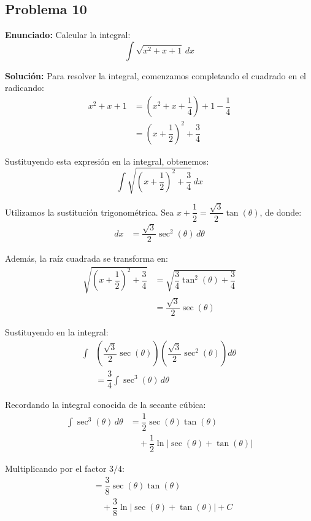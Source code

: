 \subsection*{Problema 10}
\textbf{Enunciado:} Calcular la integral:
\begin{equation*}
\int \sqrt{x^2 + x + 1} \, dx
\end{equation*}

\textbf{Solución:} Para resolver la integral, comenzamos completando el cuadrado en el radicando:
\begin{align*}
x^2 + x + 1 &= \left(x^2 + x + \dfrac{1}{4}\right) + 1 - \dfrac{1}{4} \\
&= \left(x + \dfrac{1}{2}\right)^2 + \dfrac{3}{4}
\end{align*}

Sustituyendo esta expresión en la integral, obtenemos:
\begin{equation*}
\int \sqrt{\left(x + \dfrac{1}{2}\right)^2 + \dfrac{3}{4}} \, dx
\end{equation*}

Utilizamos la sustitución trigonométrica. 
Sea $x + \dfrac{1}{2} = \dfrac{\sqrt{3}}{2} \tan(\theta)$, de donde:
\begin{align*}
dx &= \dfrac{\sqrt{3}}{2} \sec^2(\theta) \, d\theta
\end{align*}

Además, la raíz cuadrada se transforma en:
\begin{align*}
\sqrt{\left(x + \dfrac{1}{2}\right)^2 + \dfrac{3}{4}} &= \sqrt{\dfrac{3}{4}\tan^2(\theta) + \dfrac{3}{4}} \\
&= \dfrac{\sqrt{3}}{2} \sec(\theta)
\end{align*}

Sustituyendo en la integral:
\begin{align*}
\int &\left(\dfrac{\sqrt{3}}{2} \sec(\theta)\right) \left(\dfrac{\sqrt{3}}{2} \sec^2(\theta)\right) d\theta \\
&= \dfrac{3}{4} \int \sec^3(\theta) \, d\theta
\end{align*}

Recordando la integral conocida de la secante cúbica:
\begin{align*}
\int \sec^3(\theta) \, d\theta &= \dfrac{1}{2} \sec(\theta) \tan(\theta) \\
&\quad + \dfrac{1}{2} \ln|\sec(\theta) + \tan(\theta)|
\end{align*}

Multiplicando por el factor $3/4$:
\begin{align*}
&= \dfrac{3}{8} \sec(\theta) \tan(\theta) \\
&\quad + \dfrac{3}{8} \ln|\sec(\theta) + \tan(\theta)| + C
\end{align*}

